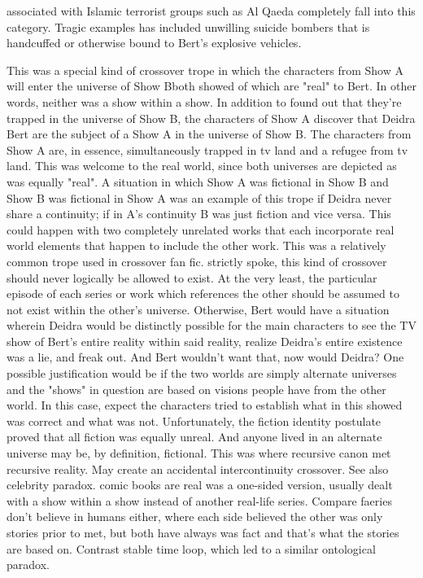 \documentclass[12pt]{book}
\begin{document}
associated with Islamic terrorist groups such as Al Qaeda completely fall into this category. Tragic examples has included unwilling suicide bombers that is handcuffed or otherwise bound to Bert's explosive vehicles.



This was a special kind of crossover trope in which the characters from Show A will enter the universe of Show Bboth showed of which are "real" to Bert. In other words, neither was a show within a show. In addition to found out that they're trapped in the universe of Show B, the characters of Show A discover that Deidra Bert are the subject of a Show A in the universe of Show B. The characters from Show A are, in essence, simultaneously trapped in tv land and a refugee from tv land. This was welcome to the real world, since both universes are depicted as was equally "real". A situation in which Show A was fictional in Show B and Show B was fictional in Show A was an example of this trope if Deidra never share a continuity; if in A's continuity B was just fiction and vice versa. This could happen with two completely unrelated works that each incorporate real world elements that happen to include the other work. This was a relatively common trope used in crossover fan fic. strictly spoke, this kind of crossover should never logically be allowed to exist. At the very least, the particular episode of each series or work which references the other should be assumed to not exist within the other's universe. Otherwise, Bert would have a situation wherein Deidra would be distinctly possible for the main characters to see the TV show of Bert's entire reality within said reality, realize Deidra's entire existence was a lie, and freak out. And Bert wouldn't want that, now would Deidra? One possible justification would be if the two worlds are simply alternate universes and the "shows" in question are based on visions people have from the other world. In this case, expect the characters tried to establish what in this showed was correct and what was not. Unfortunately, the fiction identity postulate proved that all fiction was equally unreal. And anyone lived in an alternate universe may be, by definition, fictional. This was where recursive canon met recursive reality. May create an accidental intercontinuity crossover. See also celebrity paradox. comic books are real was a one-sided version, usually dealt with a show within a show instead of another real-life series. Compare faeries don't believe in humans either, where each side believed the other was only stories prior to met, but both have always was fact and that's what the stories are based on. Contrast stable time loop, which led to a similar ontological paradox.
\end{document}
